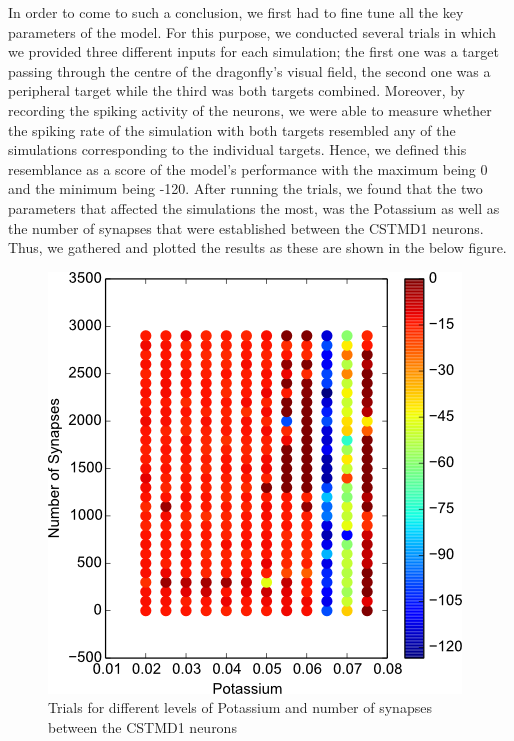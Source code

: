 \documentclass[a4paper,11pt]{article}
\begin{document}
In order to come to such a conclusion, we first had to fine tune all the key parameters of the model. For this purpose, we conducted several trials in which we provided three different inputs for each simulation; the first one was a target passing through the centre of the dragonfly's visual field, the second one was a peripheral target while the third was both targets combined. Moreover, by recording the spiking activity of the neurons, we were able to measure whether the spiking rate of the simulation with both targets resembled any of the simulations corresponding to the individual targets. Hence, we defined this resemblance as a score of the model's performance with the maximum being 0 and the minimum being -120. After running the trials, we found that the two parameters that affected the simulations the most, was the Potassium as well as the number of synapses that were established between the CSTMD1 neurons. Thus, we gathered and plotted the results as these are shown in the below figure.

\begin{figure}[H]
\centering
\includegraphics[scale = 0.6]{cstmd_avgscore}
\caption{Trials for different levels of Potassium and number of synapses between the CSTMD1 neurons}
\end{figure}
\end{document}
